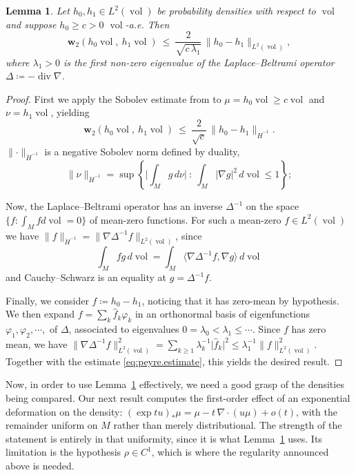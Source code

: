 \documentclass[11pt,reqno]{amsart}
\theoremstyle{plain}
\newtheorem{lem}[thm]{Lemma}
\theoremstyle{definition}
\newcommand{\dw}{\mathbf{w}_2}
\newcommand{\Hm}{\dot H^{-1}}
\DeclareMathOperator{\vol}{vol}
\DeclareMathOperator{\Div}{div}
\begin{document}
\begin{lem}\label{lem:density.comparison}
    Let \( h_0,h_1\in L^2(\vol) \) be probability densities with respect to \( \vol \) and suppose \( h_0\ge c>0 \) \( \vol \)-a.e.  
    Then
    \[
        \dw\left(h_0\vol,\ h_1\vol\right)\ \le\ \frac{2}{\sqrt{c\,\lambda_1}}\,\lVert h_0-h_1\rVert_{L^2(\vol)} ,
    \]
    where \( \lambda_1>0 \) is the first non-zero eigenvalue of the Laplace--Beltrami operator \( \Delta\coloneqq -\Div\nabla \).
\end{lem}

\begin{proof}
    First we apply the Sobolev estimate from \cite[Corollary 3]{peyre_comparison_2018} to \( \mu=h_0\vol\ge c\vol \) and \( \nu=h_1\vol \), yielding
    \begin{equation}\label{eq:peyre.estimate}
        \dw\left(h_0\vol,\ h_1\vol\right)\ \le\ \frac{2}{\sqrt c}\,\lVert h_0-h_1\rVert_{\Hm}.
    \end{equation}
    \( \lVert\cdot\rVert_{\Hm} \) is a negative Sobolev norm defined by duality,
    \[
        \lVert\nu\rVert_{\Hm}
        =\sup\left\{\lvert\textstyle\int_Mg\,d\nu\rvert\ :\
            \textstyle\int_M\lvert\nabla g\rvert^2\,d\vol\le1\right\} ;
    \]
    
    Now, the Laplace--Beltrami operator has an inverse \(\Delta^{-1}\) on the space \(\{f: \int_M f d\vol = 0\}\) of mean-zero functions. 
    For such a mean-zero \( f\in L^2(\vol) \) we have \( \lVert f\rVert_{\Hm}=\lVert\nabla\Delta^{-1}f\rVert_{L^2(\vol)} \), since 
    \[
        \int_Mfg\,d\vol=\int_M\langle\nabla\Delta^{-1}f,\nabla g\rangle\,d\vol
    \] 
    and Cauchy--Schwarz is an equality at \( g=\Delta^{-1}f \).

    Finally, we consider \( f\coloneqq h_0-h_1 \), noticing that it has zero-mean by hypothesis.
    We then expand \( f = \sum_k\hat f_k\varphi_k \) in an orthonormal basis of eigenfunctions \(\varphi_1, \varphi_2, \cdots,\) of \( \Delta \), associated to eigenvalues \( 0=\lambda_0<\lambda_1\le\cdots \).
    Since \( f \) has zero mean, we have \( \lVert\nabla\Delta^{-1}f\rVert^2_{L^2(\vol)}=\sum_{k\ge1}\lambda_k^{-1}\lvert\hat f_k\rvert^2 \le\lambda_1^{-1}\lVert f\rVert^2_{L^2(\vol)} \).
    Together with the estimate \eqref{eq:peyre.estimate}, this yields the desired result.
\end{proof}

Now, in order to use Lemma~\ref{lem:density.comparison} effectively, we need a good grasp of the densities being compared. 
Our next result computes the first-order effect of an exponential deformation on the density: \( (\exp tu)_\ast\mu=\mu-t\,\nabla\!\cdot(u\mu)+o(t) \), with the remainder uniform on \( M \) rather than merely distributional.
The strength of the statement is entirely in that uniformity, since it is what Lemma~\ref{lem:density.comparison} uses.
Its limitation is the hypothesis \( \rho\in C^1 \), which is where the regularity announced above is needed.
\end{document}
